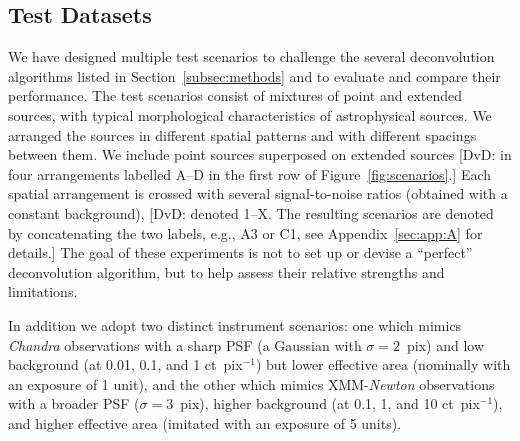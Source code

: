 \documentclass[twocolumn]{aastex631}
\newcommand{\jolideco}{\textit{Jolideco}~}
\newcommand{\dvd}[1]{{\color{red} [DvD: #1]}}
\begin{document}
    \subsection{Test Datasets}
    \label{subsec:test-datasets}
    We have designed multiple test scenarios to challenge the several deconvolution algorithms listed in Section~\ref{subsec:methods} and to evaluate and compare their performance. The test scenarios consist of mixtures of point and extended sources, with typical morphological characteristics of astrophysical sources. We arranged the sources in different spatial patterns and with different spacings between them. We include point sources superposed on extended sources \dvd{in four arrangements labelled A--D in the first row of Figure~\ref{fig:scenarios}.} Each spatial arrangement is crossed with several signal-to-noise ratios (obtained with a constant background),
    \dvd{denoted 1--X. The resulting scenarios are denoted by concatenating the two labels, e.g., A3 or C1, see Appendix~\ref{sec:app:A} for details.}  The goal of these experiments is not to set up or devise a \enquote{perfect} deconvolution algorithm, but to help assess their relative strengths and limitations.  
    
    In addition we adopt two distinct instrument scenarios: one which mimics \textit{Chandra} observations with a sharp PSF (a Gaussian with $\sigma=2$~pix) and low background (at 0.01, 0.1, and 1 ct~pix$^{-1}$) but lower effective area (nominally with an exposure of 1 unit), and the other which mimics XMM-\textit{Newton} observations with a broader PSF ($\sigma=3$~pix), higher background (at 0.1, 1, and 10 ct~pix$^{-1}$), and higher effective area (imitated with an exposure of 5 units).
    
    
\end{document}
